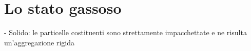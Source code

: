 \section{Lo stato gassoso}
- Solido: le particelle costituenti sono strettamente impacchettate e ne risulta un'aggregazione rigida
